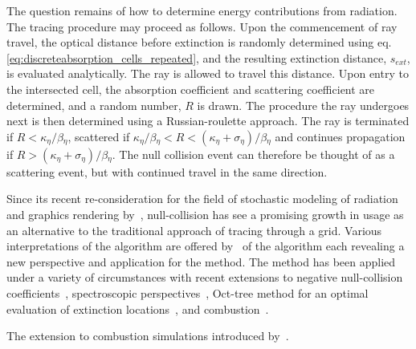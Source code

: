 The question remains of how to determine energy contributions from radiation. 
The tracing procedure may proceed as follows. Upon the commencement of ray travel, the optical distance before extinction is randomly determined using eq. \ref{eq:discreteabsorption_cells_repeated}, and the resulting extinction distance, $s_{ext}$, is evaluated analytically.
The ray is allowed to travel this distance. Upon entry to the intersected cell, the absorption coefficient and scattering coefficient are determined, and a random number, $R$ is drawn.
The procedure the ray undergoes next is then determined using a Russian-roulette approach.
The ray is terminated if $R<\kappa{}_\eta{}/\beta{}_\eta{}$, scattered if $\kappa{}_\eta{}/\beta{}_\eta{}<R<(\kappa{}_\eta{}+\sigma{}_\eta{})/\beta{}_\eta{}$ and continues propagation if $R>(\kappa{}_\eta{}+\sigma{}_\eta{})/\beta{}_\eta{}$. 
The null collision event can therefore be thought of as a scattering event, but with continued travel in the same direction.

Since its recent re-consideration for the field of stochastic modeling of radiation and graphics rendering by~\citet{Galtier2013IntegralAlgorithms}, null-collision has see a promising growth in usage as an alternative to the traditional approach of tracing through a grid. 
Various interpretations of the algorithm are offered by~\citet{ElHafi2021ThreeAlgorithms} of the algorithm each revealing a new perspective and application for the method.
The method has been applied under a variety of circumstances with recent extensions to negative null-collision coefficients~\cite{}, spectroscopic perspectives~\cite{}, Oct-tree method for an optimal evaluation of extinction locations~\cite{Villefranque2019AAtmospheres}, and combustion~\cite{Eymet2013Null-collisionSimulators}.

The extension to combustion simulations introduced by~\citet{Eymet2013Null-collisionSimulators}.


